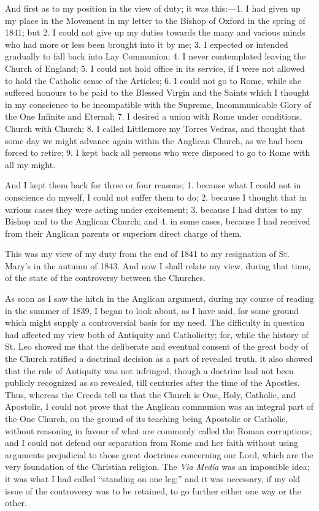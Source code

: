 And first as to my position in the view of duty; it was this:—1. I
had given up my place in the Movement in my letter to the Bishop
of Oxford in the spring of 1841; but 2. I could not give up my duties
towards the many and various minds who had more or less been brought
into it by me; 3. I expected or intended gradually to fall back into Lay
Communion; 4. I never contemplated leaving the Church of England; 5. I
could not hold office in its service, if I were not allowed to hold the
Catholic sense of the Articles; 6. I could not go to Rome, while she
suffered honours to be paid to the Blessed Virgin and the Saints which I
thought in my conscience to be incompatible with the Supreme,
Incommunicable Glory of the One Infinite and Eternal; 7. I desired a
union with Rome under conditions, Church with Church; 8. I called
Littlemore my Torres Vedras, and thought that some day we might advance
again within the Anglican Church, as we had been forced to retire; 9. I
kept back all persons who were disposed to go to Rome with all my might.

And I kept them back for three or four reasons; 1. because what I
could not in conscience do myself, I could not suffer them to do; 2.
because I thought that in various cases they were acting under
excitement; 3. because I had duties to my
Bishop and to the Anglican Church; and 4. in some cases, because I had
received from their Anglican parents or superiors direct charge of them.

This was my view of my duty from the end of 1841 to my resignation
of St. Mary's in the autumn of 1843. And now I shall relate my view,
during that time, of the state of the controversy between the Churches.

As soon as I saw the hitch in the Anglican argument, during my course
of reading in the summer of 1839, I began to look about, as I have said,
for some ground which might supply a controversial basis for my need.
The difficulty in question had affected my view both of Antiquity and
Catholicity; for, while the history of St. Leo showed me that the
deliberate and eventual consent of the great body of the Church ratified
a doctrinal decision as a part of revealed truth, it also showed
that the rule of Antiquity was not infringed, though a doctrine had not
been publicly recognized as so revealed, till centuries after the time of the Apostles.
Thus, whereas the Creeds tell us that the Church is One, Holy, Catholic,
and Apostolic, I could not prove that the Anglican communion was an
integral part of the One Church, on the ground of its teaching
being Apostolic or Catholic, without reasoning in favour of what are
commonly called the Roman corruptions; and I could not defend our
separation from Rome and her faith without using arguments
prejudicial to those great doctrines concerning our Lord, which are the
very foundation of the Christian religion. The \emph{Via Media} was an
impossible idea; it was what I had called ``standing on one
leg;'' and it was necessary, if my old issue of the controversy was
to be retained, to go further either one way or the other.

